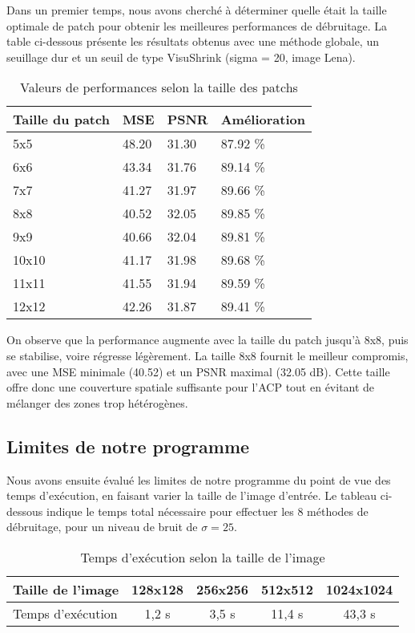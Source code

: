 Dans un premier temps, nous avons cherché à déterminer quelle était la taille optimale de patch pour obtenir les meilleures performances de débruitage. La table ci-dessous présente les résultats obtenus avec une méthode globale, un seuillage dur et un seuil de type VisuShrink (sigma = 20, image Lena).

\begin{table}[hbt!]
    \centering
    \begin{tabular}{|l|l|l|l|}
    \hline
        Taille du patch & MSE & PSNR & Amélioration \\ \hline
        5x5 & 48.20 & 31.30 & 87.92 \%\\ \hline
        6x6 & 43.34 & 31.76 & 89.14 \%\\ \hline
        7x7 & 41.27 & 31.97 & 89.66 \%\\ \hline
        8x8 & 40.52 & 32.05 & 89.85 \%\\ \hline
        9x9 & 40.66 & 32.04 & 89.81 \%\\ \hline
        10x10 & 41.17 & 31.98 & 89.68 \%\\ \hline
        11x11 & 41.55 & 31.94 & 89.59 \%\\ \hline
        12x12 & 42.26 & 31.87 & 89.41 \%\\ \hline
    \end{tabular}
    \caption{Valeurs de performances selon la taille des patchs}
\end{table}

On observe que la performance augmente avec la taille du patch jusqu’à 8x8, puis se stabilise, voire régresse légèrement. La taille 8x8 fournit le meilleur compromis, avec une MSE minimale (40.52) et un PSNR maximal (32.05 dB). Cette taille offre donc une couverture spatiale suffisante pour l’ACP tout en évitant de mélanger des zones trop hétérogènes.


\subsection{Limites de notre programme}

Nous avons ensuite évalué les limites de notre programme du point de vue des temps d'exécution, en faisant varier la taille de l'image d'entrée. Le tableau ci-dessous indique le temps total nécessaire pour effectuer les 8 méthodes de débruitage, pour un niveau de bruit de $\sigma = 25$.

\begin{table}[hbt!]
    \centering
    \begin{tabular}{|l|c|c|c|c|}
    \hline
        Taille de l'image & 128x128 & 256x256 & 512x512 & 1024x1024 \\ \hline
        Temps d’exécution & 1,2 s & 3,5 s & 11,4 s & 43,3 s \\ \hline
    \end{tabular}
    \caption{Temps d’exécution selon la taille de l'image}
\end{table}

